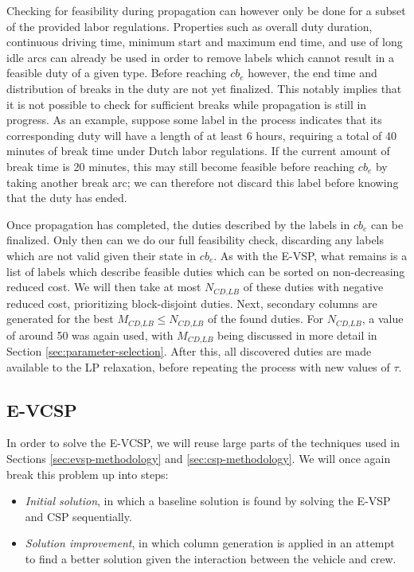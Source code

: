 \documentclass[]{article}
\begin{document}
Checking for feasibility during propagation can however only be done for a subset of the provided labor regulations. Properties such as overall duty duration, continuous driving time, minimum start and maximum end time, and use of long idle arcs can already be used in order to remove labels which cannot result in a feasible duty of a given type. Before reaching $cb_e$ however, the end time and distribution of breaks in the duty are not yet finalized. This notably implies that it is not possible to check for sufficient breaks while propagation is still in progress. As an example, suppose some label in the process indicates that its corresponding duty will have a length of at least 6 hours, requiring a total of 40 minutes of break time under Dutch labor regulations. If the current amount of break time is 20 minutes, this may still become feasible before reaching $cb_e$ by taking another break arc; we can therefore not discard this label before knowing that the duty has ended.  

Once propagation has completed, the duties described by the labels in $cb_e$ can be finalized. Only then can we do our full feasibility check, discarding any labels which are not valid given their state in $cb_e$. As with the E-VSP, what remains is a list of labels which describe feasible duties which can be sorted on non-decreasing reduced cost. We will then take at most $N_{\textit{CD,LB}}$ of these duties with negative reduced cost, prioritizing block-disjoint duties. Next, secondary columns are generated for the best $M_{\textit{CD,LB}} \leq N_{\textit{CD,LB}}$ of the found duties. For $N_{\textit{CD,LB}}$, a value of around 50 was again used, with $M_{\textit{CD,LB}}$ being discussed in more detail in Section \ref{sec:parameter-selection}. After this, all discovered duties are made available to the LP relaxation, before repeating the process with new values of $\tau$. 

\subsection{E-VCSP}
In order to solve the E-VCSP, we will reuse large parts of the techniques used in Sections \ref{sec:evsp-methodology} and \ref{sec:csp-methodology}. We will once again break this problem up into steps: 
\begin{itemize}
  \item \textit{Initial solution}, in which a baseline solution is found by solving the E-VSP and CSP sequentially.
  \item \textit{Solution improvement}, in which column generation is applied in an attempt to find a better solution given the interaction between the vehicle and crew.
\end{itemize}
\end{document}
